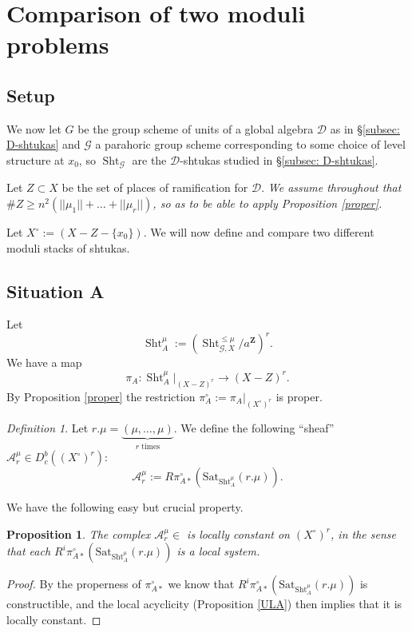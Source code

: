 \documentclass[reqno]{amsart}
\numberwithin{equation}{section}
\newcommand{\Z}{\mathbf{Z}}
\newcommand{\Cal}[1]{\mathcal{#1}}
\newcommand{\co}{\colon}
\newcommand{\mrm}[1]{\mathrm{#1}}
\newcommand{\cX}{X^{\circ}}
\DeclareMathOperator{\Sht}{Sht}
\newtheorem{prop}[thm]{Proposition}
\theoremstyle{remark}
\newtheorem{defn}[thm]{Definition}
\numberwithin{equation}{section}
\begin{document}
\section{Comparison of two moduli problems}\label{moduli  problems}

\subsection{Setup}\label{subsec: A and B setup}
We now let $G$ be the group scheme of units of a global algebra $\Cal{D}$ as in \S \ref{subsec: D-shtukas} and $\Cal{G}$ a parahoric group scheme corresponding to some choice of level structure at $x_0$, so $\Sht_{\Cal{G}}$ are the $\Cal{D}$-shtukas studied in \S \ref{subsec: D-shtukas}. 

Let $Z \subset X$ be the set of places of ramification for $\Cal{D}$. \emph{We assume throughout that $\# Z  \geq n^2 (||\mu_1|| + \ldots + || \mu_r||)$, so as to be able to apply Proposition \ref{proper}.}

Let $\cX := (X-Z-\{x_0\})$. We will now define and compare two different moduli stacks of shtukas. 


\subsection{Situation A}Let 
\[
\Sht_A^{\mu} := (\Sht_{\Cal{G}, X}^{\leq \mu}/a^{\Z})^r.
\]
We have a map 
\[
\pi_A \co \Sht_A^{\mu}|_{(X-Z)^r}  \rightarrow (X-Z)^r.
\]
By Proposition \ref{proper} the restriction $\pi_A^{\circ} := \pi_A|_{(\cX)^r}$ is proper.

\begin{defn}Let $r.\mu = \underbrace{(\mu, \ldots, \mu)}_{r \text{ times}}$. We define the following ``sheaf'' $\Cal{A}^{\mu}_r \in D_c^b((\cX)^r) $: 
\[
\Cal{A}^{\mu}_r := R\pi_{A*}^{\circ} ( \mrm{Sat}_{\Sht_A^{\mu} }(r.\mu)).
\]
\end{defn}

We have the following easy but crucial property. 

\begin{prop}\label{A is local system}
The complex $\Cal{A}^{\mu}_r \in $ is locally constant on $(\cX)^r$, in the sense that each $R^i\pi_{A*}^{\circ} ( \mrm{Sat}_{\Sht_A^{\mu}}(r.\mu))$ is a local system. 
\end{prop}

\begin{proof}
By the properness of $\pi_{A*}^{\circ}$ we know that $R^i\pi_{A*}^{\circ}  (  \mrm{Sat}_{\Sht_A^{\mu}}(r.\mu))$ is constructible, and the local acyclicity (Proposition \ref{ULA}) then implies that it is locally constant.
\end{proof}
\end{document}
